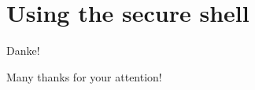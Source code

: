 \documentclass[10pt]{vcs_beamer}
\begin{document}


\section{Using the secure shell}








\begin{frame}{Danke!}
\begin{center}
\huge
Many thanks for your attention!  \ttt{:-)}
\end{center}
\end{frame}
\end{document}

